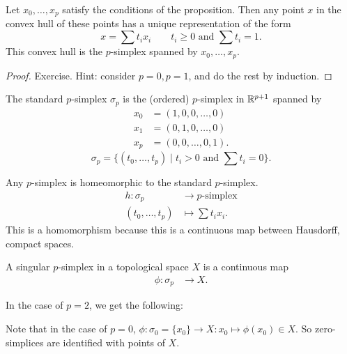 \begin{prop}
    Let $x_0, \ldots, x_p$ satisfy the conditions of the proposition.
    Then any point $x$ in the convex hull of these points has a unique representation of the form
    \[
    x = \sum t_i x_i \qquad  t_i \ge  0 \text{ and } \sum t_i = 1
    .\]
    This convex hull is the $p$-simplex spanned by $x_0, \ldots, x_p$.
\end{prop}
\begin{proof}
    Exercise. Hint: consider $p = 0, p = 1$, and do the rest by induction.
\end{proof}
\begin{definition}
    The standard $p$-simplex $\sigma_p$ is the (ordered) $p$-simplex in $\mathbb{R}^{p+1}$ spanned by
    \begin{align*}
        x_0 &= (1, 0, 0, \ldots, 0)\\
        x_1 &= (0, 1, 0, \ldots, 0)\\
        x_p &= (0, 0, \ldots, 0, 1)
    .\end{align*}
    \[
        \sigma_p = \{(t_0, \ldots, t_p)  \mid  t_i>0 \text{ and }\sum t_i = 0 \}
    .\]
\end{definition}
\begin{remark}
    Any $p$-simplex is homeomorphic to the standard $p$-simplex.
    \begin{align*}
        h: \sigma_p &\longrightarrow \text{$p$-simplex} \\
        (t_0, \ldots, t_p) &\longmapsto \sum t_i x_i
    .\end{align*}
    This is a homomorphism because this is a continuous map between Hausdorff, compact spaces.
\end{remark}
\begin{definition}
    A singular $p$-simplex in a topological space $X$ is a continuous map
    \begin{align*}
        \phi: \sigma_p &\longrightarrow X
    .\end{align*}
\end{definition}
In the case of $p=2$, we get the following:
\begin{figure}[H]
    \centering
    \label{fig:definition-singular-p-simplex}
\end{figure}

Note that in the case of $p=0$,  $\phi:\sigma_0 = \{x_0\} \to  X: x_0 \mapsto  \phi(x_0) \in X$.
So zero-simplices are identified with points of $X$.

